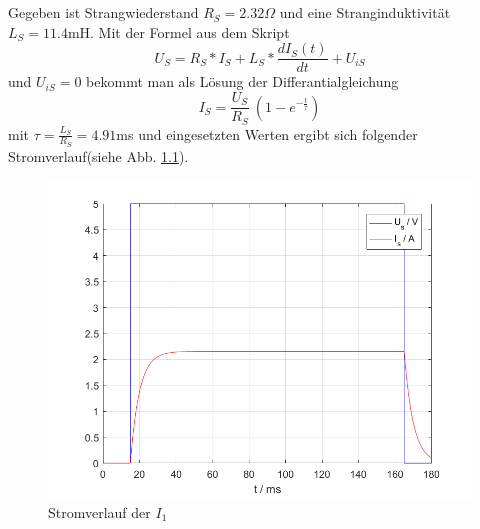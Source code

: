 \chapter{}\label{ex:aufg2}

\section{}\label{sec:aufg2a}
Gegeben ist Strangwiederstand $R_S = 2.32 \Omega$ und eine Stranginduktivität $L_S= 11.4$mH.
Mit der Formel aus dem Skript
\begin{equation}
	U_S = R_S * I_S + L_S * \frac{dI_S(t)}{dt} + U_{iS}
\end{equation}
und $U_{iS} = 0$ bekommt man als Lösung der Differantialgleichung
\begin{equation}
	I_S = \frac{U_S}{R_S}~( 1 - e^{-\frac{t}{\tau}})
\end{equation}
mit $\tau = \frac{L_S}{R_S} = 4.91$ms und eingesetzten Werten ergibt sich folgender Stromverlauf(siehe Abb. \ref{fig:2a_stromverlauf_I1}).
\begin{figure}[htb]
	\includegraphics[width=\textwidth]{./Bilder/2a_Stromverlauf_1}
	\caption{Stromverlauf der $I_1$}
	\label{fig:2a_stromverlauf_I1}
\end{figure}

